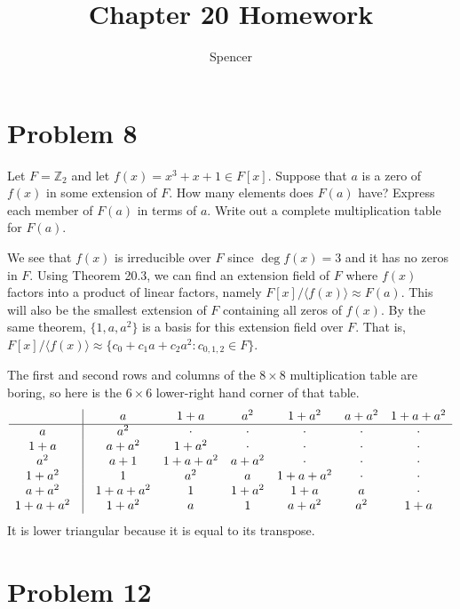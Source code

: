 \documentclass{article}
\title{Chapter 20 Homework}
\author{Spencer}
\begin{document}
\maketitle

\newcommand{\Z}{\mathbb{Z}}
\newcommand{\R}{\mathbb{R}}
\newcommand{\N}{\mathbb{N}}
\newcommand{\Q}{\mathbb{Q}}

\section*{Problem 8}

Let $F=\Z_2$ and let $f(x)=x^3+x+1\in F[x]$.  Suppose that $a$ is a zero of
$f(x)$ in some extension of $F$.  How many elements does $F(a)$ have?
Express each member of $F(a)$ in terms of $a$.  Write out a complete
multiplication table for $F(a)$.

We see that $f(x)$ is irreducible over $F$ since $\deg f(x)=3$ and it
has no zeros in $F$.  Using Theorem 20.3, we can find an extension
field of $F$ where $f(x)$ factors into a product of linear factors,
namely $F[x]/\langle f(x)\rangle\approx F(a)$.  This will also be
the smallest extension of $F$ containing all zeros of $f(x)$.
By the same theorem, $\{1,a,a^2\}$ is a basis for this extension
field over $F$.  That is, $F[x]/\langle f(x)\rangle\approx\{c_0+c_1a+c_2a^2:c_{0,1,2}\in F\}$.

The first and second rows and columns of the $8\times 8$ multiplication table
are boring, so here is the $6\times 6$ lower-right hand corner of that table.
\begin{equation*}
\begin{array}{cccccccc}
 & \vline & a & 1+a & a^2 & 1+a^2 & a+a^2 & 1+a+a^2 \\
\hline
a & \vline & a^2 & \cdot & \cdot & \cdot & \cdot & \cdot \\
1+a & \vline & a+a^2 & 1+a^2 & \cdot & \cdot & \cdot & \cdot \\
a^2 & \vline & a+1 & 1+a+a^2 & a+a^2 & \cdot & \cdot & \cdot \\
1+a^2 & \vline & 1 & a^2 & a & 1+a+a^2 & \cdot & \cdot \\
a+a^2 & \vline & 1+a+a^2 & 1 & 1+a^2 & 1+a & a & \cdot \\
1+a+a^2 & \vline & 1+a^2 & a & 1 & a+a^2 & a^2 & 1+a
\end{array}
\end{equation*}
It is lower triangular because it is equal to its transpose.

\section*{Problem 12}
\end{document}
